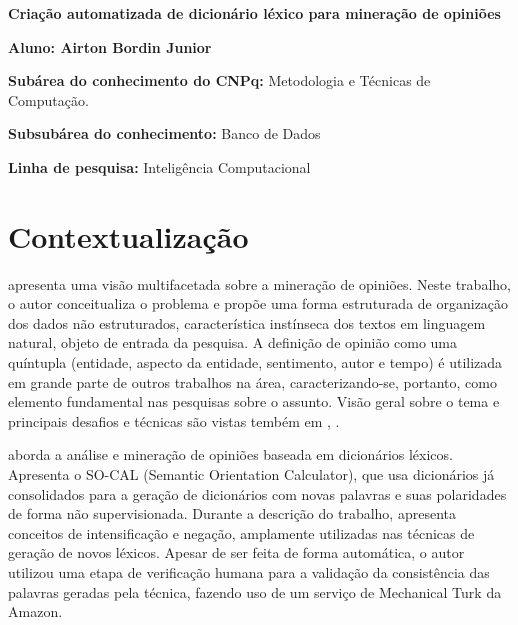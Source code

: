 \documentclass[a4paper,11pt]{article}
\begin{document}
\selectfont



\begin{framed}
\begin{center}
\textbf{\Large{Criação automatizada de dicionário léxico para mineração de opiniões}}

\textbf{Aluno: Airton Bordin Junior}
\end{center}

\textbf{Subárea do conhecimento do CNPq:} Metodologia e Técnicas de Computação.

\textbf{Subsubárea do conhecimento:} Banco de Dados

\textbf{Linha de pesquisa:} Inteligência Computacional

\end{framed}

\section{Contextualização}
\cite{liu2010multifaceted} apresenta uma visão multifacetada sobre a mineração de opiniões. Neste trabalho, o autor conceitualiza o problema e propõe uma forma estruturada de organização dos dados não estruturados, característica instínseca dos textos em linguagem natural, objeto de entrada da pesquisa. A definição de opinião como uma quíntupla (entidade, aspecto da entidade, sentimento, autor e tempo) é utilizada em grande parte de outros trabalhos na área, caracterizando-se, portanto, como elemento fundamental nas pesquisas sobre o assunto. Visão geral sobre o tema e principais desafios e técnicas são vistas tembém em \cite{mohammad2016challenges}, \cite{ghaleb2016survey}.

\cite{taboada2011lexicon} aborda a análise e mineração de opiniões baseada em dicionários léxicos. Apresenta o SO-CAL (Semantic Orientation Calculator), que usa dicionários já consolidados para a geração de dicionários com novas palavras e suas polaridades de forma não supervisionada. Durante a descrição do trabalho, apresenta conceitos de intensificação e negação, amplamente utilizadas nas técnicas de geração de novos léxicos. Apesar de ser feita de forma automática, o autor utilizou uma etapa de verificação humana para a validação da consistência das palavras geradas pela técnica, fazendo uso de um serviço de Mechanical Turk da Amazon. 
\end{document}

